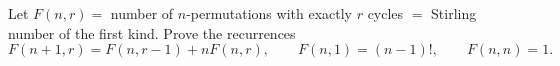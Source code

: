 Let $F(n, r) =$ number of $n$-permutations with exactly $r$ cycles $=$ Stirling number of the first kind. Prove the recurrences
\[ F(n + 1, r) = F(n, r - 1) + nF(n, r),\qquad F(n, 1) = (n - 1)!,\qquad F(n, n) = 1. \]
